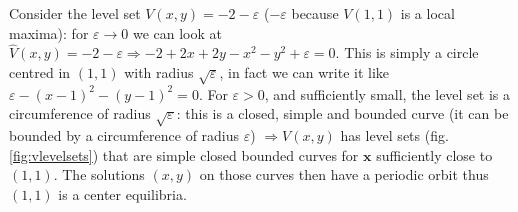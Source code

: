 \begin{enumerate}
{Consider the level set $V(x,y)=-2-\varepsilon$ ($-\varepsilon$ because $V(1,1)$ is a local maxima): for $\varepsilon \to 0$ we can look at $\hat{V}(x,y) =-2-\varepsilon \Rightarrow -2+2x+2y-x^2-y^2+\varepsilon=0$. This is simply a circle centred in $(1,1)$ with radius $\sqrt{\varepsilon}$, in fact we can write it like $\varepsilon-(x-1)^2-(y-1)^2=0$. For $\varepsilon > 0$, and sufficiently small, the level set is a circumference of radius $\sqrt{\varepsilon}$: this is a closed, simple and bounded curve (it can be bounded by a circumference of radius $\varepsilon$) $\Rightarrow V(x,y)$ has level sets (fig. \ref{fig:vlevelsets}) that are simple closed bounded curves for $\mathbf{x}$ sufficiently close to $(1,1)$. The solutions $(x,y)$ on those curves then have a periodic orbit thus $(1,1)$ is a center equilibria.
    
}
\end{enumerate}